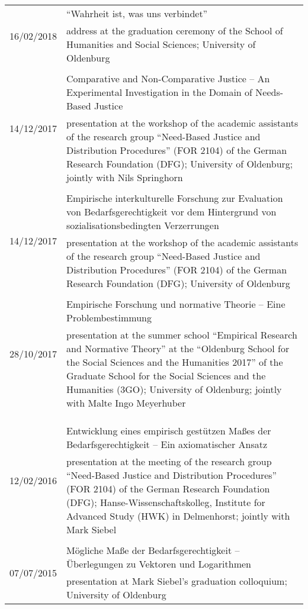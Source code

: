 \documentclass[a4paper,10pt]{article}
\begin{document}
\begin{longtable}{p{2.5cm}p{11cm}}
\\
\multirow{2}{2.5cm}{\footnotesize{16/02/2018}} & \enquote{Wahrheit ist, was uns verbindet}\\
& \footnotesize{address at the graduation ceremony of the School of Humanities and Social Sciences; University of Oldenburg}\\
\\
\multirow{2}{2.5cm}{\footnotesize{14/12/2017}} & Comparative and Non-Comparative Justice -- An Experimental Investigation in the Domain of Needs-Based Justice\\
& \footnotesize{presentation at the workshop of the academic assistants of the research group \enquote{Need-Based Justice and Distribution Procedures} (FOR 2104) of the German Research Foundation (DFG); University of Oldenburg; jointly with Nils Springhorn}\\
\\
\multirow{2}{2.5cm}{\footnotesize{14/12/2017}} & Empirische interkulturelle Forschung zur Evaluation von Bedarfsgerechtigkeit vor dem Hintergrund von sozialisationsbedingten Verzerrungen\\
& \footnotesize{presentation at the workshop of the academic assistants of the research group \enquote{Need-Based Justice and Distribution Procedures} (FOR 2104) of the German Research Foundation (DFG); University of Oldenburg}\\
\\
\multirow{2}{2.5cm}{\footnotesize{28/10/2017}} & Empirische Forschung und normative Theorie -- Eine Problembestimmung\\
& \footnotesize{presentation at the summer school \enquote{Empirical Research and Normative Theory} at the \enquote{Oldenburg School for the Social Sciences and the Humanities 2017} of the Graduate School for the Social Sciences and the Humanities (3GO); University of Oldenburg; jointly with Malte Ingo Meyerhuber}\\
\\
\\ %
\\ %
\multirow{2}{2.5cm}{\footnotesize{12/02/2016}} & Entwicklung eines empirisch gestützen Maßes der Bedarfsgerechtigkeit -- Ein axiomatischer Ansatz\\
& \footnotesize{presentation at the meeting of the research group \enquote{Need-Based Justice and Distribution Procedures} (FOR 2104) of the German Research Foundation (DFG); Hanse-Wissenschaftskolleg, Institute for Advanced Study (HWK) in Delmenhorst; jointly with Mark Siebel}\\
\\
\multirow{2}{2.5cm}{\footnotesize{07/07/2015}} & Mögliche Maße der Bedarfsgerechtigkeit -- Überlegungen zu Vektoren und Logarithmen\\
& \footnotesize{presentation at Mark Siebel's graduation colloquium; University of Oldenburg}\\
\end{longtable}
\end{document}
